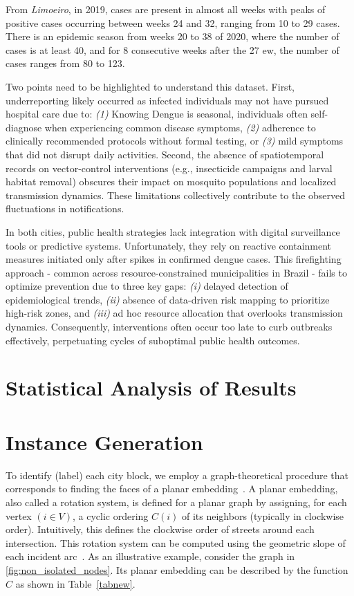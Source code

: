 From \textit{Limoeiro}, in 2019, cases are present in almost all weeks with
peaks of positive cases occurring between weeks 24 and 32, ranging from 10 to 29
cases. There is an epidemic season from weeks 20 to 38 of 2020, where the number
of cases is at least 40, and for 8 consecutive weeks after the 27 \gls{ew}, the
number of cases ranges from 80 to 123.

Two points need to be highlighted to understand this dataset. First,
underreporting likely occurred as infected individuals may not have pursued
hospital care due to: \textit{(1)} Knowing Dengue is seasonal, individuals often
self-diagnose when experiencing common disease symptoms, \textit{(2)} adherence
to clinically recommended protocols without formal testing, or \textit{(3)} mild
symptoms that did not disrupt daily activities. Second, the absence of
spatiotemporal records on vector-control interventions (e.g., insecticide
campaigns and larval habitat removal) obscures their impact on mosquito
populations and localized transmission dynamics. These limitations collectively
contribute to the observed fluctuations in notifications.

In both cities, public health strategies lack integration with digital
surveillance tools or predictive systems. Unfortunately, they rely on reactive
containment measures initiated only after spikes in confirmed dengue cases. This
firefighting approach - common across resource-constrained municipalities in
Brazil - fails to optimize prevention due to three key gaps: \textit{(i)}
delayed detection of epidemiological trends, \textit{(ii)} absence of
data-driven risk mapping to prioritize high-risk zones, and \textit{(iii)} ad
hoc resource allocation that overlooks transmission dynamics. Consequently,
interventions often occur too late to curb outbreaks effectively, perpetuating
cycles of suboptimal public health outcomes.



\section{Statistical Analysis of Results}\label{subsec:statistical-analysis}

\section{Instance Generation}\label{sec:instance-generation}

To identify (label) each city block, we employ a graph-theoretical procedure
that corresponds to finding the faces of a planar
embedding~\citep{diestel2024graph}. A planar embedding, also called a rotation
system, is defined for a planar graph by assigning, for each vertex $( i \in V
	)$, a cyclic ordering $C(i)$ of its neighbors (typically in clockwise order).
Intuitively, this defines the clockwise order of streets around each
intersection. This rotation system can be computed using the geometric slope of
each incident arc~\citep{PhilipKleinShayMozes}. As an illustrative example,
consider the graph in \ref{fig:non_isolated_nodes}. Its planar embedding can be
described by the function $C$ as shown in Table~\ref{tabnew}.

